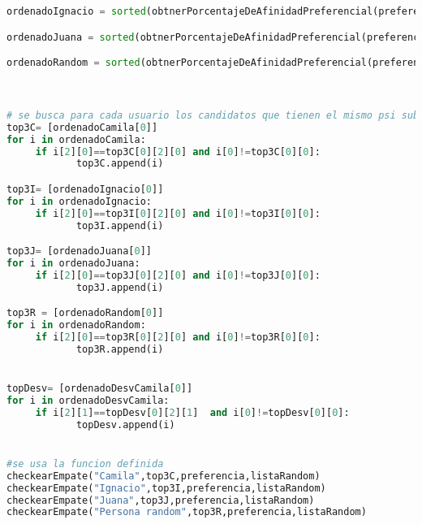 \documentclass[a4paper]{article}
\begin{document}
\begin{lstlisting}[language=Python]
ordenadoIgnacio = sorted(obtnerPorcentajeDeAfinidadPreferencial(preferencia,listaRandom)[2], key = lambda x: x[2][0], reverse=True)

ordenadoJuana = sorted(obtnerPorcentajeDeAfinidadPreferencial(preferencia,listaRandom)[3], key = lambda x: x[2][0], reverse=True)

ordenadoRandom = sorted(obtnerPorcentajeDeAfinidadPreferencial(preferencia,listaRandom)[0], key = lambda x: x[2][0], reverse=True)



# se busca para cada usuario los candidatos que tienen el mismo psi sub t (caso de empate)
top3C= [ordenadoCamila[0]]
for i in ordenadoCamila:
     if i[2][0]==top3C[0][2][0] and i[0]!=top3C[0][0]:
            top3C.append(i)

top3I= [ordenadoIgnacio[0]]
for i in ordenadoIgnacio:
     if i[2][0]==top3I[0][2][0] and i[0]!=top3I[0][0]:
            top3I.append(i)

top3J= [ordenadoJuana[0]]
for i in ordenadoJuana:
     if i[2][0]==top3J[0][2][0] and i[0]!=top3J[0][0]:
            top3J.append(i)

top3R = [ordenadoRandom[0]]
for i in ordenadoRandom:
     if i[2][0]==top3R[0][2][0] and i[0]!=top3R[0][0]:
            top3R.append(i)


topDesv= [ordenadoDesvCamila[0]]
for i in ordenadoDesvCamila:
     if i[2][1]==topDesv[0][2][1]  and i[0]!=topDesv[0][0]:
            topDesv.append(i)          


#se usa la funcion definida
checkearEmpate("Camila",top3C,preferencia,listaRandom)
checkearEmpate("Ignacio",top3I,preferencia,listaRandom)
checkearEmpate("Juana",top3J,preferencia,listaRandom)
checkearEmpate("Persona random",top3R,preferencia,listaRandom) 
\end{lstlisting}
\end{document}
